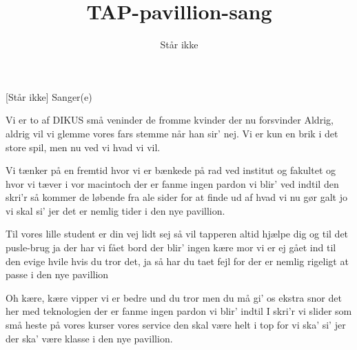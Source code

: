 \documentclass[a4paper,11pt]{article}
\title{TAP-pavillion-sang}
\author{Står ikke}
\begin{document}
\maketitle

\begin{roles}
[Står ikke] Sanger(e)
\end{roles}


\begin{song}
Vi er to af DIKUS små veninder
de fromme kvinder
der nu forsvinder
Aldrig, aldrig vil vi glemme
vores fars stemme
når han sir' nej.
Vi er kun en brik i det store spil,
men nu ved vi hvad vi vil.

Vi tænker på en fremtid
hvor vi er bænkede på rad
ved institut og fakultet
og hvor vi tæver i vor macintoch
der er fanme ingen pardon
vi blir' ved indtil den skri'r
så kommer de løbende fra ale sider
for at finde ud af hvad
vi nu gør galt
jo vi skal si' jer det er nemlig tider
i den nye pavillion.

Til vores lille student
er din vej lidt sej
så vil tapperen altid hjælpe dig
og til det pusle-brug
ja der har vi fået bord
der blir' ingen kære mor
vi er ej gået ind til den evige hvile
hvis du tror det, ja så har du taet fejl
for der er nemlig rigeligt at passe
i den nye pavillion

Oh kære, kære vipper
vi er bedre und du tror
men du må gi' os ekstra snor
det her med teknologien
der er fanme ingen pardon
vi blir' indtil I skri'r
vi slider som små heste på vores kurser
vores service den skal være helt i top
for vi ska' si' jer der ska' være klasse
i den nye pavillion.
\end{song}
\end{document}
